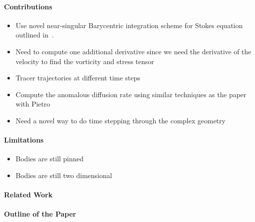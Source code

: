 \documentclass[preprint, 10pt]{elsarticle}
\begin{document}
\paragraph{Contributions}
\begin{itemize}
  \item Use novel near-singular Barycentric integration scheme for
    Stokes equation outlined in~\cite{bar-wu-vee2015}.
  \item Need to compute one additional derivative since we need the
    derivative of the velocity to find the vorticity and stress tensor
  \item Tracer trajectories at different time steps
  \item Compute the anomalous diffusion rate using similar techniques as
    the paper with Pietro~\cite{dea-qua-bir-jua2018}
  \item Need a novel way to do time stepping through the complex
    geometry
\end{itemize}

\paragraph{Limitations}
\begin{itemize}
  \item Bodies are still pinned
  \item Bodies are still two dimensional
\end{itemize}

\paragraph{Related Work}

\paragraph{Outline of the Paper}

\end{document}
